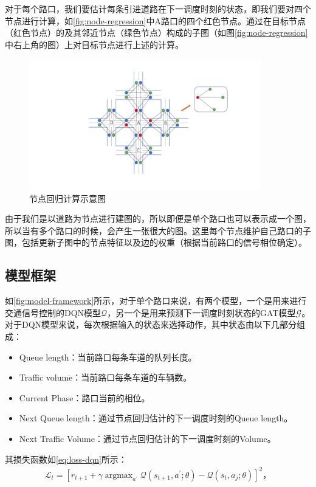 对于每个路口，我们要估计每条引进道路在下一调度时刻的状态，即我们要对四个节点进行计算，如\autoref{fig:node-regression}中A路口的四个红色节点。通过在目标节点（红色节点）的及其邻近节点（绿色节点）构成的子图（如图\autoref{fig:node-regression}中右上角的图）上对目标节点进行上述的计算。
\begin{figure}[htb]
  \includegraphics[width=0.9\textwidth]{fig/node-regression.pdf}
  \caption{节点回归计算示意图}
  \label{fig:node-regression}
\end{figure}
由于我们是以道路为节点进行建图的，所以即便是单个路口也可以表示成一个图，所以当有多个路口的时候，会产生一张很大的图。这里每个节点维护自己路口的子图，包括更新子图中的节点特征以及边的权重（根据当前路口的信号相位确定）。

\subsection{模型框架}
如\autoref{fig:model-framework}所示，对于单个路口来说，有两个模型，一个是用来进行交通信号控制的DQN模型$\mathcal{Q}$，另一个是用来预测下一调度时刻状态的GAT模型$\mathcal{G}$。
对于DQN模型来说，每次根据输入的状态来选择动作，其中状态由以下几部分组成：
\begin{itemize}
  \item Queue length：当前路口每条车道的队列长度。
  \item Traffic volume：当前路口每条车道的车辆数。
  \item Current Phase：路口当前的相位。
  \item Next Queue length：通过节点回归估计的下一调度时刻的Queue length。
  \item Next Traffic Volume：通过节点回归估计的下一调度时刻的Volume。
\end{itemize}
其损失函数如\autoref{eq:loss-dqn}所示：
\begin{align}
  \label{eq:loss-dqn}
  \mathcal{L}_t=[ r_{t+1}+\gamma \mathop{\arg\max}_{a^{\prime}} \mathcal{Q}(s_{t+1},a^{'};\theta)-\mathcal{Q}(s_t,a_j;\theta)]^2，
\end{align}

